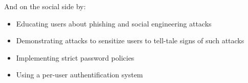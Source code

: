 And on the social side by:

\begin{itemize}

\item{Educating users about phishing and social engineering attacks}

\item{Demonstrating attacks to sensitize users to tell-tale signs of such attacks}

\item{Implementing strict password policies}

\item{Using a per-user authentification system}

\end{itemize}